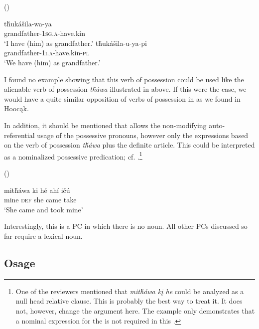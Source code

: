 \documentclass[output=paper]{LSP/langsci}
\begin{document}
\ea {} (\citealt[102]{Buechel1939}) \label{lakotahavegrandfather}

\ea \gll t\v{h}ukášila-wa-ya \\
grandfather-\textsc{1sg.a}-have.kin \\
\trans `I have (him) as grandfather.'
\ex \gll t\v{h}ukášila-u-ya-pi \\
grandfather-\textsc{1i.a}-have.kin-\textsc{pl} \\
\glt `We have (him) as grandfather.'
\z \z

 
I found no example showing that this verb of possession could be used like the alienable verb of possession \textit{t\v{h}\'awa} illustrated in  above. If this were the case, we would have a quite similar opposition of verbs of possession in  as we found in Hoocąk. 
 

In addition, it should be mentioned that  allows the non-modifying auto-referential usage of the possessive pronouns, however only the expressions based on the verb of possession \textit{t\v{h}\'awa} plus the definite article. This could be interpreted as a nominalized possessive predication; cf. .\footnote{One of the reviewers mentioned that \textit{mit\v{h}áwa kį he} could be analyzed as a null head relative clause. This is probably the best way to treat it. It does not, however, change the argument here. The example only demonstrates that a nominal expression for the  is not required in this .}

\ea	{} (\citealt[22]{Buechel1939}) \label{lakotatookmine}

\gll mit\v{h}áwa ki      h\'e   ahí     i\v{c}ú \\
mine        \textsc{def} she came take \\
\glt `She came and took mine'
\z

Interestingly, this is a PC in which there is no  noun. All other PCs discussed so far require a  lexical noun.
 
\subsection{Osage}\label{sec:helmbrecht:4.5} \label{osage}
\end{document}
